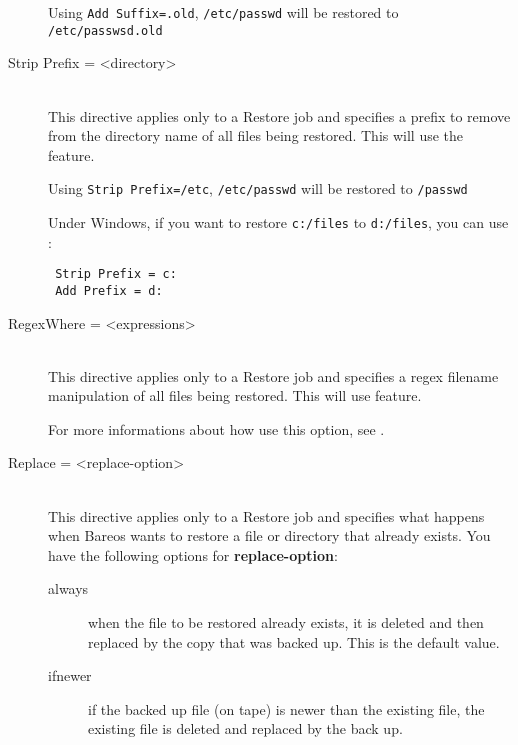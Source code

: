 \begin{description}
Using \texttt{Add Suffix=.old}, \texttt{/etc/passwd} will be restored to
\texttt{/etc/passwsd.old}

\item [Strip Prefix = {\textless}directory{\textgreater}] \hfill \\
This directive applies only to a Restore job and specifies a prefix to remove
from the directory name of all files being restored.  This will use the
 feature.

Using \texttt{Strip Prefix=/etc}, \texttt{/etc/passwd} will be restored to
\texttt{/passwd}

Under Windows, if you want to restore \texttt{c:/files} to \texttt{d:/files},
you can use :

\begin{verbatim}
 Strip Prefix = c:
 Add Prefix = d:
\end{verbatim}

\item [RegexWhere = {\textless}expressions{\textgreater}] \hfill \\
This directive applies only to a Restore job and specifies a regex filename
manipulation of all files being restored.  This will use  feature.

For more informations about how use this option, see
.

\item [Replace = {\textless}replace-option{\textgreater}] \hfill \\
This directive applies only to a Restore job and specifies what happens
when Bareos wants to restore a file or directory that already exists.
You have the following options for {\bf replace-option}:

\begin{description}

\item [always]
when the file to be restored already exists, it is deleted and then
replaced by the copy that was backed up.  This is the default value.

\item [ifnewer]
if the backed up file (on tape) is newer than the existing file, the
existing file is deleted and replaced by the back up.


\end{description}
\end{description}
